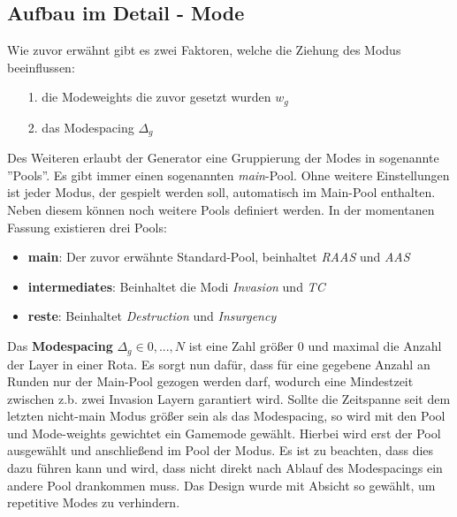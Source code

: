     \subsection{Aufbau im Detail - Mode}
        Wie zuvor erwähnt gibt es zwei Faktoren, welche die Ziehung des Modus beeinflussen:
        \begin{itemize}
            \item [1.] die Modeweights die zuvor gesetzt wurden $w_g$ 
            \item [2.] das Modespacing $\Delta_g$
        \end{itemize}
        Des Weiteren erlaubt der Generator eine Gruppierung der Modes in sogenannte ''Pools''. 
        Es gibt immer einen sogenannten \textit{main}-Pool. 
        Ohne weitere Einstellungen ist jeder Modus, der gespielt werden soll, automatisch im Main-Pool enthalten. 
        Neben diesem können noch weitere Pools definiert werden. 
        In der momentanen Fassung existieren drei Pools:
        \begin{itemize}
            \item \textbf{main}: Der zuvor erwähnte Standard-Pool, beinhaltet \textit{RAAS} und \textit{AAS}
            \item \textbf{intermediates}: Beinhaltet die Modi \textit{Invasion} und \textit{TC}
            \item \textbf{reste}: Beinhaltet \textit{Destruction} und \textit{Insurgency}
        \end{itemize}

        Das \textbf{Modespacing} $\Delta_g\in{0,...,N}$ ist eine Zahl größer $0$ und maximal die Anzahl der Layer in einer Rota.
        Es sorgt nun dafür, dass für eine gegebene Anzahl an Runden nur der Main-Pool gezogen werden darf, wodurch eine \glqq{}Mindestzeit\grqq{} zwischen z.b. zwei Invasion Layern garantiert wird.
        Sollte die Zeitspanne seit dem letzten nicht-main Modus größer sein als das Modespacing, so wird mit den Pool und Mode-weights gewichtet ein Gamemode gewählt. 
        Hierbei wird erst der Pool ausgewählt und anschließend im Pool der Modus. 
        Es ist zu beachten, dass dies dazu führen kann und wird, dass nicht direkt nach Ablauf des Modespacings ein andere Pool drankommen muss. 
        Das Design wurde mit Absicht so gewählt, um repetitive Modes zu verhindern.

